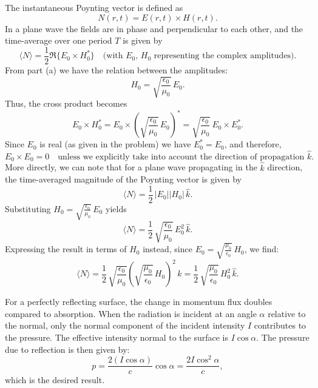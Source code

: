\documentclass{article}
\begin{document}
The instantaneous Poynting vector is defined as
\[
N(r,t) = E(r,t) \times H(r,t).
\]
In a plane wave the fields are in phase and perpendicular to each other, and the time-average over one period \(T\) is given by
\[
\langle N \rangle = \frac{1}{2} \Re\{E_0 \times H_0^*\} \quad \text{(with } E_0,\,H_0 \text{ representing the complex amplitudes)}.
\]
From part (a) we have the relation between the amplitudes:
\[
H_0 = \sqrt{\frac{\epsilon_0}{\mu_0}}\,E_0.
\]
Thus, the cross product becomes
\[
E_0 \times H_0^* = E_0 \times \left(\sqrt{\frac{\epsilon_0}{\mu_0}}\,E_0\right)^* = \sqrt{\frac{\epsilon_0}{\mu_0}}\,E_0 \times E_0^*.
\]
Since \(E_0\) is real (as given in the problem) we have \(E_0^* = E_0\), and therefore,
\[
E_0 \times E_0 = 0 \quad \text{unless we explicitly take into account the direction of propagation } \hat{k}.
\]
More directly, we can note that for a plane wave propagating in the \(\hat{k}\) direction, the time-averaged magnitude of the Poynting vector is given by
\[
\langle N \rangle = \frac{1}{2}\,|E_0||H_0|\,\hat{k}.
\]
Substituting \(H_0 = \sqrt{\frac{\epsilon_0}{\mu_0}}\,E_0\) yields
\[
\langle N \rangle = \frac{1}{2}\, \sqrt{\frac{\epsilon_0}{\mu_0}}\, E_0^2\,\hat{k}.
\]
Expressing the result in terms of \(H_0\) instead, since \(E_0 = \sqrt{\frac{\mu_0}{\epsilon_0}}\,H_0\), we find:
\[
\langle N \rangle = \frac{1}{2}\, \sqrt{\frac{\epsilon_0}{\mu_0}} \left(\sqrt{\frac{\mu_0}{\epsilon_0}}\,H_0\right)^2\,\hat{k} = \frac{1}{2}\, \sqrt{\frac{\mu_0}{\epsilon_0}}\, H_0^2\,\hat{k}.
\]

For a perfectly reflecting surface, the change in momentum flux doubles compared to absorption. When the radiation is incident at an angle \(\alpha\) relative to the normal, only the normal component of the incident intensity \(I\) contributes to the pressure. The effective intensity normal to the surface is \(I \cos\alpha\). The pressure due to reflection is then given by:
\[
p = \frac{2(I\cos\alpha)}{c}\cos\alpha = \frac{2I\cos^2\alpha}{c},
\]
which is the desired result.
\end{document}
